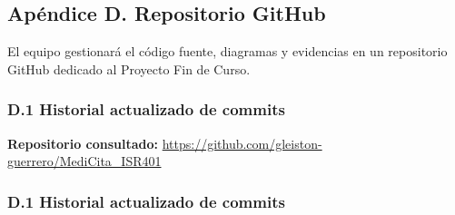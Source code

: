 \documentclass[11pt,a4paper]{article}
\begin{document}
	
	
	\subsection{Apéndice D. Repositorio GitHub}
	
	El equipo gestionará el código fuente, diagramas y evidencias en un repositorio GitHub dedicado al Proyecto Fin de Curso.
	
	
	\subsubsection{D.1 Historial actualizado de commits}
	
	
	\noindent
	\textbf{Repositorio consultado:}
	\url{https://github.com/gleiston-guerrero/MediCita_ISR401}
	
	\subsubsection{D.1 Historial actualizado de commits}
	
	
	\begingroup
	\scriptsize
	\setlength{\tabcolsep}{3pt}
	\renewcommand{\arraystretch}{1.15}
	
\end{document}
